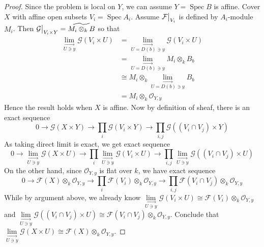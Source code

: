 \documentclass{ctexart}
\newcommand{\spec}{\operatorname{Spec}}
\newcommand{\colimit}[1]{\underset{#1}{\underset{\longrightarrow}{\lim}}}
\begin{document}
\begin{proof}
    Since the problem is local on $Y$, we can assume $Y = \spec B$ is affine.
    Cover $X$ with affine open subsets $V_{i} = \spec A_{i}$.
    Assume $\mathcal{F}\big{|}_{V_{i}}$ is defined by $A_{i}$-module $M_{i}$.
    Then $\mathcal{G}\big{|}_{V_{i} \times Y} = \widetilde{M_{i} \otimes_{k} B}$ so that
    \begin{equation}
        \begin{split}
            \colimit{U\ni y} \mathcal{G}(V_{i} \times U) & = \colimit{U = D(b)\ni y} \mathcal{G}(V_{i} \times U) \\
            & = \colimit{U = D(b)\ni y} M_{i} \otimes_{k} B_{b} \\
            & \cong M_{i} \otimes_{k} \colimit{U = D(b)\ni y} B_{b} \\
            & = M_{i} \otimes_{k} \mathcal{O}_{Y, y}
        \end{split}
    \end{equation}
    Hence the result holds when $X$ is affine.
    Now by definition of sheaf, there is an exact sequence
    \begin{equation}
        0 \longrightarrow \mathcal{G}(X \times Y) \longrightarrow \prod_{i} \mathcal{G}(V_{i} \times Y) \longrightarrow \prod_{i, j} \mathcal{G}((V_{i} \cap V_{j}) \times Y)
    \end{equation}
    As taking direct limit is exact, we get exact sequence
    \begin{equation}
        0 \longrightarrow \colimit{U\ni y} \mathcal{G}(X \times U) \longrightarrow \prod_{i} \colimit{U\ni y} \mathcal{G}(V_{i} \times U) \longrightarrow \prod_{i, j} \colimit{U\ni y} \mathcal{G}((V_{i} \cap V_{j}) \times U)
    \end{equation}
    On the other hand, since $\mathcal{O}_{Y, y}$ is flat over $k$, we have exact sequence
    \begin{equation}
        0 \longrightarrow \mathcal{F}(X) \otimes_{k} \mathcal{O}_{Y, y} \longrightarrow \prod_{i} \mathcal{F}(V_{i}) \otimes_{k} \mathcal{O}_{Y, y} \longrightarrow \prod_{i, j} \mathcal{F}(V_{i} \cap V_{j}) \otimes_{k} \mathcal{O}_{Y, y}
    \end{equation}
    While by argument above, we already know $\colimit{U\ni y} \mathcal{G}(V_{i} \times U) \cong \mathcal{F}(V_{i}) \otimes_{k} \mathcal{O}_{Y, y}$ and $\colimit{U\ni y} \mathcal{G}((V_{i} \cap V_{j}) \times U) \cong \mathcal{F}(V_{i} \cap V_{j}) \otimes_{k} \mathcal{O}_{Y, y}$.
    Conclude that $\colimit{U\ni y} \mathcal{G}(X \times U) \cong \mathcal{F}(X) \otimes_{k} \mathcal{O}_{Y, y}$.
\end{proof}
\end{document}
